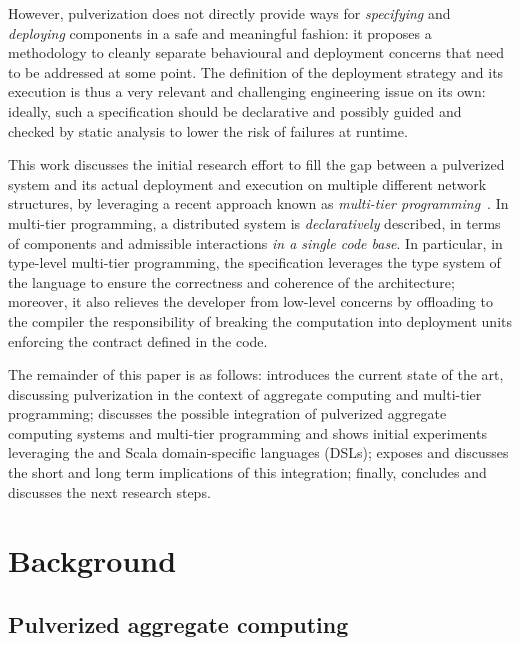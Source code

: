 However, pulverization does not directly provide ways for \emph{specifying} and \emph{deploying} components in a safe and meaningful fashion:
it proposes a methodology to cleanly separate behavioural and deployment concerns that need to be addressed at some point.
%
The definition of the deployment strategy and its execution is thus a very relevant and challenging engineering issue on its own:
ideally, such a specification should be declarative
 and possibly guided and checked by static analysis
 to lower the risk of failures at runtime.

This work discusses the initial research effort to fill the gap between a pulverized system and its actual deployment and execution on multiple different network structures,
by leveraging a recent approach known as \emph{multi-tier programming}~\cite{DBLP:journals/csur/WeisenburgerWS20}.
%
In multi-tier programming, a distributed system is \emph{declaratively} described, in terms of components and admissible interactions \emph{in a single code base}.
%
In particular, in type-level multi-tier programming, the specification leverages the type system of the language to ensure the correctness and coherence of the architecture;
moreover, 
it also relieves the developer from low-level concerns %
by offloading to the compiler
the responsibility of breaking the computation into deployment units %
 enforcing the contract defined in the code.

The remainder of this paper is as follows:
 introduces the current state of the art, discussing pulverization in the context of aggregate computing and multi-tier programming;
 discusses the possible integration of pulverized aggregate computing systems and multi-tier programming and shows initial experiments leveraging the \scafi{} and \scalaloci{} Scala domain-specific languages (DSLs);
 exposes and discusses the short and long term implications of this integration;
finally,
 concludes and discusses the next research steps.

\section{Background}
\label{background}
\subsection{Pulverized aggregate computing}

